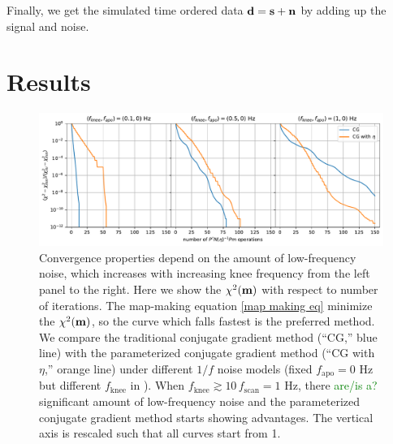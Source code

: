 \documentclass[twocolumn,linenumbers]{aastex631}
\newcommand{\Eq}[1]{\text{Eq.\,\ref{#1}}}
\newcommand{\vbm}{\vb{m}}
\newcommand{\textgreen}[1]{\textcolor{green}{#1}}
\begin{document}
Finally, we get the simulated time ordered data $\vb{d} = \vb{s} + \vb{n}$ by
adding up {the} signal and noise.

\section{Results} \label{sec:results}

\begin{figure}[tb!]
\centering
\includegraphics[width=\textwidth]{pink_noise_chi2.pdf}
\caption{
    Convergence properties depend on the amount of low-frequency noise,
    which increases with increasing knee frequency from the left panel to the right.
    Here we show the $\chi^2(\vbm)$ with respect to number of iterations. 
    The map-making equation \ref{map making eq} minimize the $\chi^2(\vbm)$, so
    the curve which falls fastest is the preferred method.
    We compare the traditional conjugate gradient method (``{CG},'' blue line)
    with the parameterized conjugate gradient method (``{CG with $\eta$},'' orange line)
    under different $1/f$ noise models (fixed $f_\text{apo}=0$ Hz but different $f_\text{knee}$ in \Eq{noise power spectrum}).
    When $f_\text{knee} \gtrsim 10\,f_\text{scan} = 1$ Hz, there \textgreen{are/is a?} significant amount of
    low-frequency noise and the parameterized conjugate gradient method starts showing advantages.  The vertical axis is rescaled  such that all curves start from 1.
}
\label{1/f noise chi2}
\end{figure}
\end{document}
